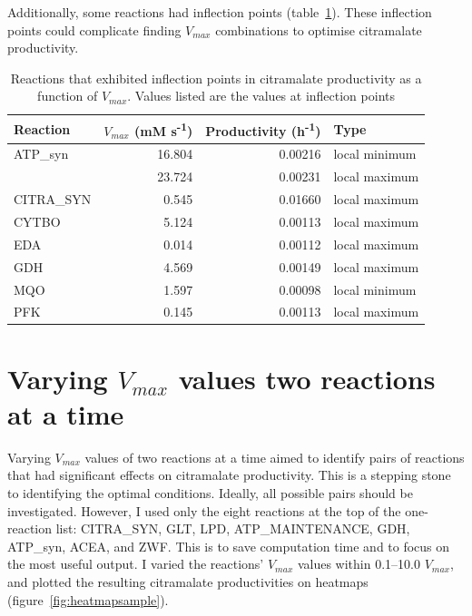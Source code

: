 \documentclass[parskip=full, numbers=noenddot]{scrreprt}
\begin{document}
Additionally, some reactions had inflection points (table~\ref{tab:inflection}). These inflection points could complicate finding $V_{max}$ combinations to optimise citramalate productivity.

\begin{table}[!htbp]
  \caption{Reactions that exhibited inflection points in citramalate productivity as a function of $V_{max}$. Values listed are the values at inflection points}
  \label{tab:inflection}
  \centering
  \begin{tabular}{lrrl}
    \toprule
    Reaction & $V_{max}$ (mM s\textsuperscript{-1}) & Productivity (h\textsuperscript{-1}) & Type\\
    \midrule
    ATP\_syn & 16.804 & 0.00216 & local minimum\\
    & 23.724 & 0.00231 & local maximum\\
    CITRA\_SYN & 0.545 & 0.01660 & local maximum\\
    CYTBO & 5.124 & 0.00113 & local maximum\\
    EDA & 0.014 & 0.00112 & local maximum\\
    GDH & 4.569 & 0.00149 & local maximum\\
    MQO & 1.597 & 0.00098 & local minimum\\
    PFK & 0.145 & 0.00113 & local maximum\\
    \bottomrule
  \end{tabular}
\end{table}


\section{Varying $V_{max}$ values two reactions at a time}
\label{sec:couples}

Varying $V_{max}$ values of two reactions at a time aimed to identify pairs of reactions that had significant effects on citramalate productivity. This is a stepping stone to identifying the optimal conditions. Ideally, all possible pairs should be investigated. However, I used only the eight reactions at the top of the one-reaction list: CITRA\_SYN, GLT, LPD, ATP\_MAINTENANCE, GDH, ATP\_syn, ACEA, and ZWF. This is to save computation time and to focus on the most useful output. I varied the reactions' $V_{max}$ values within 0.1--10.0 $V_{max}$, and plotted the resulting citramalate productivities on heatmaps (figure~\ref{fig:heatmapsample}). %
\end{document}
